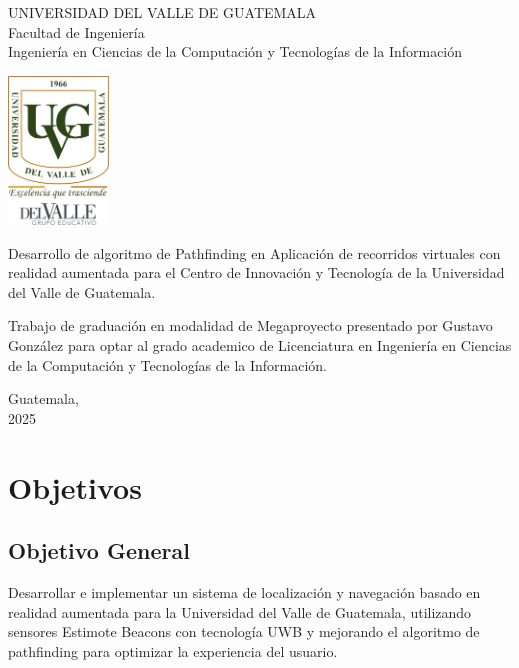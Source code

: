 \documentclass{article}
\begin{document}
\begin{center}
    \begin{doublespace}
        \thispagestyle{empty}  %
        \Large{UNIVERSIDAD DEL VALLE DE GUATEMALA}\\
        Facultad de Ingeniería \\
        Ingeniería en Ciencias de la Computación y Tecnologías de la Información 
    
        \vspace{15mm} 
        \includegraphics[width=0.2\textwidth]{images/Uvg_logo.jpg}
    
        \vspace{15mm} 
        {\Large Desarrollo de algoritmo de Pathfinding en Aplicación de recorridos virtuales con realidad aumentada para el Centro de Innovación y Tecnología de la Universidad del Valle de Guatemala.}
    
        \vspace{10mm} 
        {\Large Trabajo de graduación en modalidad de Megaproyecto presentado por Gustavo González
        para optar al grado academico de Licenciatura en Ingeniería en Ciencias de la Computación y Tecnologías de la Información.}
    
        {\Large Guatemala, \\ 2025}
        
    \end{doublespace}
    \end{center}



\section{Objetivos}
\subsection{Objetivo General}
{\justify Desarrollar e implementar un sistema de localización y navegación basado en realidad aumentada para la Universidad 
del Valle de Guatemala, utilizando sensores Estimote Beacons con tecnología UWB y mejorando el algoritmo de pathfinding para 
optimizar la experiencia del usuario.}
\end{document}
